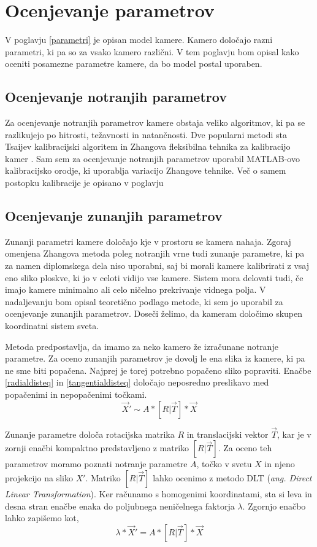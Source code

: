 \documentclass[a4paper, 12pt]{book}
\begin{document}
\section{Ocenjevanje parametrov}
V poglavju \ref{parametri} je opisan model kamere. Kamero določajo razni parametri, ki pa so za vsako kamero različni. V tem poglavju bom opisal kako oceniti posamezne parametre kamere, da bo model postal uporaben.

\subsection{Ocenjevanje notranjih parametrov}
Za ocenjevanje notranjih parametrov kamere obstaja veliko algoritmov, ki pa se razlikujejo po hitrosti, težavnosti in natančnosti. Dve popularni metodi sta Tsaijev kalibracijski algoritem \cite{horn2000tsai} in Zhangova fleksibilna tehnika za kalibracijo kamer \cite{zhang2000flexible}. Sam sem za ocenjevanje notranjih parametrov uporabil MATLAB-ovo kalibracijsko orodje, ki uporablja variacijo Zhangove tehnike. Več o samem postopku kalibracije je opisano v poglavju %

\subsection{Ocenjevanje zunanjih parametrov}
Zunanji parametri kamere določajo kje v prostoru se kamera nahaja. Zgoraj omenjena Zhangova metoda poleg notranjih vrne tudi zunanje parametre, ki pa za namen diplomskega dela niso uporabni, saj bi morali kamere kalibrirati z vsaj eno sliko ploskve, ki jo v celoti vidijo vse kamere. Sistem mora delovati tudi, če imajo kamere minimalno ali celo ničelno prekrivanje vidnega polja. V nadaljevanju bom opisal teoretično podlago metode, ki sem jo uporabil za ocenjevanje zunanjih parametrov. Doseči želimo, da kameram določimo skupen koordinatni sistem sveta.

Metoda predpostavlja, da imamo za neko kamero že izračunane notranje parametre. Za oceno zunanjih parametrov je dovolj le ena slika iz kamere, ki pa ne sme biti popačena. Najprej je torej potrebno popačeno sliko popraviti. Enačbe \eqref{radialdisteq} in \eqref{tangentialdisteq} določajo neposredno preslikavo med popačenimi in nepopačenimi točkami. 
\begin{equation}
\vec{X}' \sim A * [R | \vec{T}] * \vec{X}
\end{equation}

Zunanje parametre določa rotacijska matrika $R$ in translacijski vektor $\vec{T}$, kar je v zornji enačbi kompaktno predstavljeno z matriko $[R | \vec{T}]$. Za oceno teh parametrov moramo poznati notranje parametre $A$, točko v svetu $X$ in njeno projekcijo na sliko $X'$. Matriko $[R | \vec{T}]$ lahko ocenimo z metodo DLT (\emph{ang. Direct Linear Transformation}). Ker računamo s homogenimi koordinatami, sta si leva in desna stran enačbe enaka do poljubnega neničelnega faktorja $\lambda$. Zgornjo enačbo lahko zapišemo kot,
\begin{equation}
\lambda * \vec{X}' = A * [R | \vec{T}] * \vec{X}
\label{lambdaeq}
\end{equation}
\end{document}
